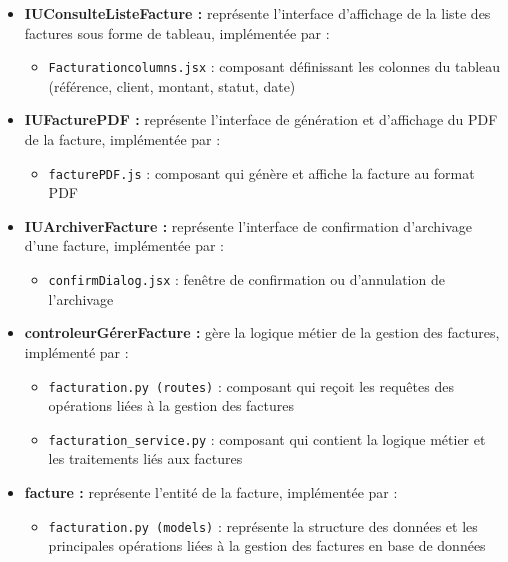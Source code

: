 \begin{itemize}[leftmargin=2em, topsep=4pt, itemsep=4pt]
  \begin{itemize}[leftmargin=2em, topsep=2pt, itemsep=2pt]
    \item \texttt{FactureModal.jsx} : composant qui affiche les détails complets d'une facture sélectionnée
  \end{itemize}
  \item \textbf{IUConsulteListeFacture :} représente l'interface d'affichage de la liste des factures sous forme de tableau, implémentée par :
  \begin{itemize}[leftmargin=2em, topsep=2pt, itemsep=2pt]
    \item \texttt{Facturationcolumns.jsx} : composant définissant les colonnes du tableau (référence, client, montant, statut, date)
  \end{itemize}
  \item \textbf{IUFacturePDF :} représente l'interface de génération et d'affichage du PDF de la facture, implémentée par :
  \begin{itemize}[leftmargin=2em, topsep=2pt, itemsep=2pt]
    \item \texttt{facturePDF.js} : composant qui génère et affiche la facture au format PDF
  \end{itemize}
  \item \textbf{IUArchiverFacture :} représente l'interface de confirmation d'archivage d'une facture, implémentée par :
  \begin{itemize}[leftmargin=2em, topsep=2pt, itemsep=2pt]
    \item \texttt{confirmDialog.jsx} : fenêtre de confirmation ou d'annulation de l'archivage
  \end{itemize}
  \item \textbf{controleurGérerFacture :} gère la logique métier de la gestion des factures, implémenté par :
  \begin{itemize}[leftmargin=2em, topsep=2pt, itemsep=2pt]
    \item \texttt{facturation.py (routes)} : composant qui reçoit les requêtes des opérations liées à la gestion des factures
    \item \texttt{facturation\_service.py} : composant qui contient la logique métier et les traitements liés aux factures
  \end{itemize}
  \item \textbf{facture :} représente l'entité de la facture, implémentée par :
  \begin{itemize}[leftmargin=2em, topsep=2pt, itemsep=2pt]
    \item \texttt{facturation.py (models)} : représente la structure des données et les principales opérations liées à la gestion des factures en base de données

\end{itemize}
\end{itemize}
